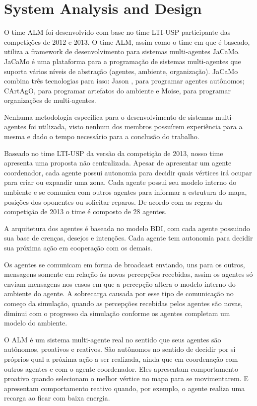 \documentclass{llncs}
\begin{document}
\section{System Analysis and Design }

O time ALM foi desenvolvido com base no time LTI-USP participante das competições de 2012 e 2013. O time ALM, assim como o time em que é baseado, utiliza a framework de desenvolvimento para sistemas multi-agentes JaCaMo. JaCaMo é uma plataforma para a programação de sistemas multi-agentes que suporta vários níveis de abstração (agentes, ambiente, organização). JaCaMo combina três tecnologias para isso: Jason , para programar agentes autônomos; CArtAgO, para programar artefatos do ambiente e Moise, para programar organizações de multi-agentes.

Nenhuma metodologia especifica para o desenvolvimento de sistemas multi-agentes foi utilizada, visto nenhum dos membros possuírem experiência para a mesma e dado o tempo necessário para a conclusão do trabalho.

Baseado no time LTI-USP da versão da competição de 2013, nosso time apresenta uma proposta não centralizada. Apesar de apresentar um agente coordenador, cada agente possui autonomia para decidir quais vértices irá ocupar para criar ou expandir uma zona. Cada agente possui seu modelo interno do ambiente e se comunica com outros agentes para informar a estrutura do mapa, posições dos oponentes ou solicitar reparos. De acordo com as regras da competição de 2013 o time é composto de 28 agentes.

A arquitetura dos agentes é baseada no modelo BDI, com cada agente possuindo sua base de crenças, desejos e intenções. Cada agente tem autonomia para decidir sua próxima ação em cooperação com os demais.

Os agentes se comunicam em forma de broadcast enviando, uns para os outros, mensagens somente em relação às novas percepções recebidas, assim os agentes só enviam mensagens nos casos em que a percepção altera o modelo interno do ambiente do agente. A sobrecarga causada por esse tipo de comunicação no começo da simulação, quando as percepções recebidas pelos agentes são novas, diminui com o progresso da simulação conforme os agentes completam um modelo do ambiente.

O ALM é um sistema multi-agente real no sentido que seus agentes são autônomos, proativos e reativos. São autônomos no sentido de decidir por si próprios qual a próxima ação a ser realizada, ainda que em coordenação com outros agentes e com o agente coordenador. Eles apresentam comportamento proativo quando selecionam o melhor vértice no mapa para se movimentarem. E apresentam comportamento reativo quando, por exemplo, o agente realiza uma recarga ao ficar com baixa energia.
\end{document}
